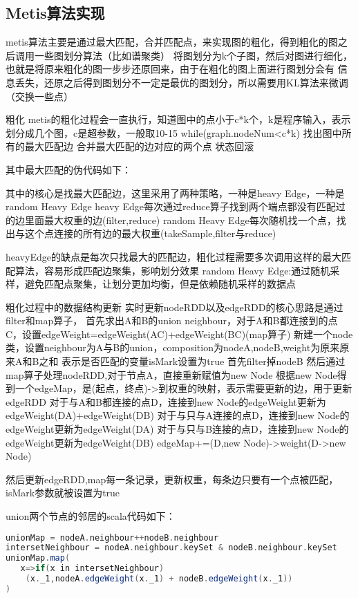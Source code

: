 \subsection{Metis算法实现}

metis算法主要是通过最大匹配，合并匹配点，来实现图的粗化，得到粗化的图之后调用一些图划分算法（比如谱聚类）
将图划分为k个子图，然后对图进行细化，也就是将原来粗化的图一步步还原回来，由于在粗化的图上面进行图划分会有
信息丢失，还原之后得到图划分不一定是最优的图划分，所以需要用KL算法来微调（交换一些点）

粗化
metis的粗化过程会一直执行，知道图中的点小于c*k个，k是程序输入，表示划分成几个图，c是超参数，一般取10-15
while(graph.nodeNum<c*k)
   找出图中所有的最大匹配边
   合并最大匹配的边对应的两个点
   状态回滚

其中最大匹配的伪代码如下：


其中的核心是找最大匹配边，这里采用了两种策略，一种是heavy Edge，一种是random Heavy Edge
heavy Edge每次通过reduce算子找到两个端点都没有匹配过的边里面最大权重的边(filter,reduce)
random Heavy Edge每次随机找一个点，找出与这个点连接的所有边的最大权重(takeSample,filter与reduce)

heavyEdge的缺点是每次只找最大的匹配边，粗化过程需要多次调用这样的最大匹配算法，容易形成匹配边聚集，影响划分效果
random Heavy Edge:通过随机采样，避免匹配点聚集，让划分更加均衡，但是依赖随机采样的数据点

粗化过程中的数据结构更新
实时更新nodeRDD以及edgeRDD的核心思路是通过filter和map算子，
首先求出A和B的union neighbour，对于A和B都连接到的点C，设置edgeWeight=edgeWeight(AC)+edgeWeight(BC)(map算子)
新建一个node类，设置neighbour为A与B的union，composition为nodeA,nodeB,weight为原来原来A和B之和
表示是否匹配的变量isMark设置为true
首先filter掉nodeB
然后通过map算子处理nodeRDD,对于节点A，直接重新赋值为new Node
根据new Node得到一个edgeMap，是(起点，终点)->到权重的映射，表示需要更新的边，用于更新edgeRDD
对于与A和B都连接的点D，连接到new Node的edgeWeight更新为edgeWeight(DA)+edgeWeight(DB)
对于与只与A连接的点D，连接到new Node的edgeWeight更新为edgeWeight(DA)
对于与只与B连接的点D，连接到new Node的edgeWeight更新为edgeWeight(DB)
edgeMap+=(D,new Node)->weight(D->new Node)

然后更新edgeRDD,map每一条记录，更新权重，每条边只要有一个点被匹配，isMark参数就被设置为true


union两个节点的邻居的scala代码如下：

\begin{lstlisting}[language=Scala]
unionMap = nodeA.neighbour++nodeB.neighbour
intersetNeighbour = nodeA.neighbour.keySet & nodeB.neighbour.keySet
unionMap.map(
   x=>if(x in intersetNeighbour)
    (x._1,nodeA.edgeWeight(x._1) + nodeB.edgeWeight(x._1))
)
\end{lstlisting}

